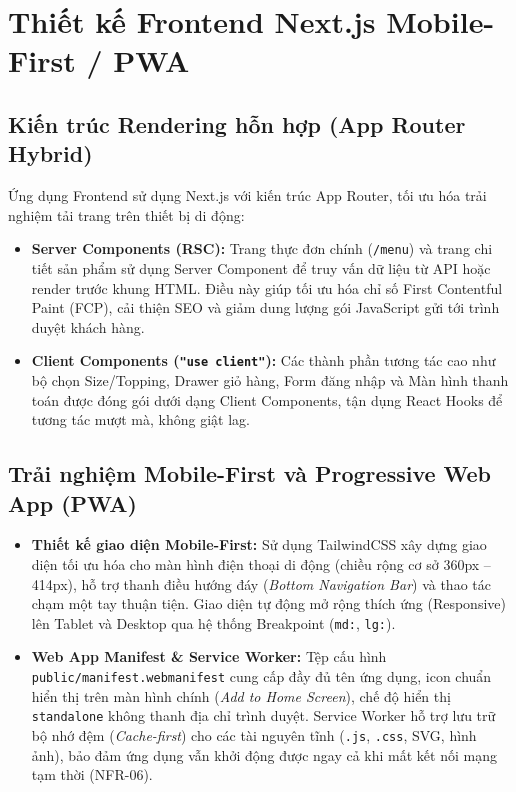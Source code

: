 \documentclass[11pt, a4paper]{article}
\begin{document}
\section{Thiết kế Frontend Next.js Mobile-First / PWA}

\subsection{Kiến trúc Rendering hỗn hợp (App Router Hybrid)}

Ứng dụng Frontend sử dụng Next.js với kiến trúc App Router, tối ưu hóa trải nghiệm tải trang trên thiết bị di động:
\begin{itemize}
	\item \textbf{Server Components (RSC):} Trang thực đơn chính (\texttt{/menu}) và trang chi tiết sản phẩm sử dụng Server Component để truy vấn dữ liệu từ API hoặc render trước khung HTML. Điều này giúp tối ưu hóa chỉ số First Contentful Paint (FCP), cải thiện SEO và giảm dung lượng gói JavaScript gửi tới trình duyệt khách hàng.
	\item \textbf{Client Components (\texttt{"use client"}):} Các thành phần tương tác cao như bộ chọn Size/Topping, Drawer giỏ hàng, Form đăng nhập và Màn hình thanh toán được đóng gói dưới dạng Client Components, tận dụng React Hooks để tương tác mượt mà, không giật lag.
\end{itemize}

\subsection{Trải nghiệm Mobile-First và Progressive Web App (PWA)}

\begin{itemize}
	\item \textbf{Thiết kế giao diện Mobile-First:} Sử dụng TailwindCSS xây dựng giao diện tối ưu hóa cho màn hình điện thoại di động (chiều rộng cơ sở 360px -- 414px), hỗ trợ thanh điều hướng đáy (\textit{Bottom Navigation Bar}) và thao tác chạm một tay thuận tiện. Giao diện tự động mở rộng thích ứng (Responsive) lên Tablet và Desktop qua hệ thống Breakpoint (\texttt{md:}, \texttt{lg:}).
	\item \textbf{Web App Manifest \& Service Worker:} Tệp cấu hình \texttt{public/manifest.webmanifest} cung cấp đầy đủ tên ứng dụng, icon chuẩn hiển thị trên màn hình chính (\textit{Add to Home Screen}), chế độ hiển thị \texttt{standalone} không thanh địa chỉ trình duyệt. Service Worker hỗ trợ lưu trữ bộ nhớ đệm (\textit{Cache-first}) cho các tài nguyên tĩnh (\texttt{.js}, \texttt{.css}, SVG, hình ảnh), bảo đảm ứng dụng vẫn khởi động được ngay cả khi mất kết nối mạng tạm thời (NFR-06).
\end{itemize}
\end{document}
